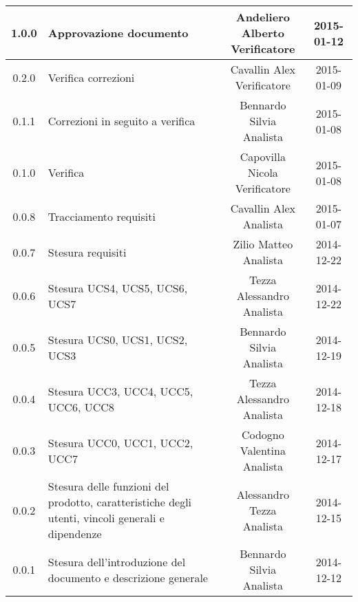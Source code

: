 \begin{center}
\begin{tabularx}{\textwidth}{cXcc}
1.0.0 & Approvazione documento & \multicell{Andeliero Alberto \\ Verificatore} & 2015-01-12  \\\midrule
0.2.0 & Verifica correzioni & \multicell{Cavallin Alex \\ Verificatore} & 2015-01-09\\\midrule
0.1.1 & Correzioni in seguito a verifica & \multicell{Bennardo Silvia \\ Analista} & 2015-01-08 \\\midrule
0.1.0 & Verifica & \multicell{Capovilla Nicola \\ Verificatore} & 2015-01-08 \\\midrule
0.0.8 & Tracciamento requisiti & \multicell{Cavallin Alex \\ Analista} & 2015-01-07 \\\midrule
0.0.7 & Stesura requisiti & \multicell{Zilio Matteo \\ Analista} & 2014-12-22 \\\midrule
0.0.6 & Stesura UCS4, UCS5, UCS6, UCS7 & \multicell{Tezza Alessandro \\ Analista} & 2014-12-22 \\\midrule
0.0.5 & Stesura UCS0, UCS1, UCS2, UCS3 & \multicell{Bennardo Silvia \\ Analista} & 2014-12-19 \\\midrule
0.0.4 & Stesura UCC3, UCC4, UCC5, UCC6, UCC8 & \multicell{Tezza Alessandro \\ Analista} & 2014-12-18 \\\midrule
0.0.3 & Stesura UCC0, UCC1, UCC2, UCC7 & \multicell{Codogno Valentina \\ Analista} & 2014-12-17 \\\midrule
0.0.2 & Stesura delle funzioni del prodotto, caratteristiche degli utenti, vincoli generali e dipendenze & \multicell{Alessandro Tezza \\ Analista} & 2014-12-15 \\\midrule
0.0.1 & Stesura dell'introduzione del documento e descrizione generale & \multicell{Bennardo Silvia \\ Analista} & 2014-12-12 \\



\bottomrule
\end{tabularx}
\end{center}
\newpage




